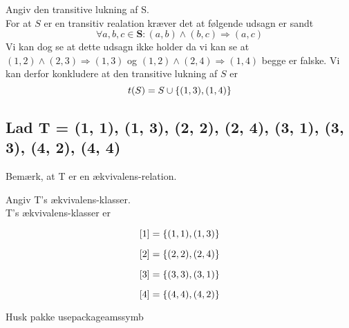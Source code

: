 Angiv den transitive lukning af S.\\

For at $S$ er en transitiv realation kræver det at følgende udsagn er sandt
\[\forall a,b,c \in \textbf{S} : (a,b) \wedge (b,c) \Rightarrow (a,c)\]
Vi kan dog se at dette udsagn ikke holder da vi kan se at $(1,2) \wedge (2,3) \Rightarrow (1,3)$ og $(1,2) \wedge (2,4) \Rightarrow (1,4)$ begge er falske. Vi kan derfor konkludere at den transitive lukning af $S$ er 
\[t(S) = S \cup \\\{(1,3),(1,4)\\\}\]

\subsection{Lad T = {(1, 1), (1, 3), (2, 2), (2, 4), (3, 1), (3, 3), (4, 2), (4, 4)}}
Bemærk, at T er en ækvivalens-relation.

Angiv T's ækvivalens-klasser.\\

T's ækvivalens-klasser er

\[[1] = \\\{(1,1),(1,3)\\\}\]

\[[2] = \\\{(2,2),(2,4)\\\}\]

\[[3] = \\\{(3,3),(3,1)\\\}\]

\[[4] = \\\{(4,4),(4,2)\\\}\]

Husk pakke usepackage{amssymb}
